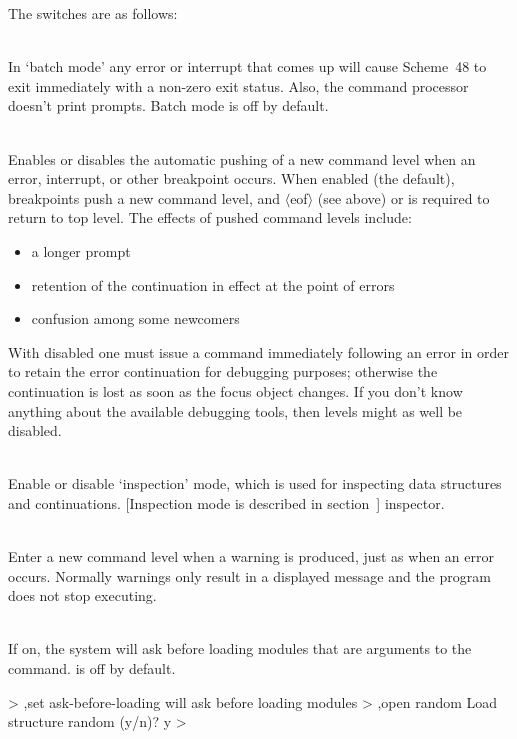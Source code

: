 The switches are as follows:
\begin{description}
\item {}\\
    In `batch mode' any error or interrupt that comes up will cause
    Scheme~48 to exit immediately with a non-zero exit status.  Also,
    the command processor doesn't print prompts.  Batch mode is
    off by default.


\item {}\\
    Enables or disables the automatic pushing of a new command level when
    an error, interrupt, or other breakpoint occurs.
    When enabled (the default), breakpoints push a new command level,
    and $\langle{}$eof$\rangle{}$ (see above)
    or  is required to return to top level.  The effects of
    pushed command levels include:
\begin{itemize}
\item a longer prompt
\item retention of the continuation in effect at the point of errors
\item confusion among some newcomers
\end{itemize}
    With  disabled one must issue a
     command immediately
    following an error in order to retain the error continuation for
    debugging purposes; otherwise the continuation is lost as soon as
    the focus object changes.  If you don't know anything about the
    available debugging tools, then levels might as well be disabled.

\item {}\\
    Enable or disable `inspection' mode, which is used for inspecting
    data structures and continuations.
    [Inspection mode is described in section~\Ref]
    {inspector}.

\item {}\\
    Enter a new command level when a warning is produced, just as
    when an error occurs.  Normally warnings only result in a displayed
    message and the program does not stop executing.

\item {} \\
    If on, the system will ask before loading modules that are arguments
    to the  command.   is off by
    default.
\begin{example}
> ,set ask-before-loading
will ask before loading modules
> ,open random
Load structure random (y/n)? y
>
\end{example}


\end{description}
